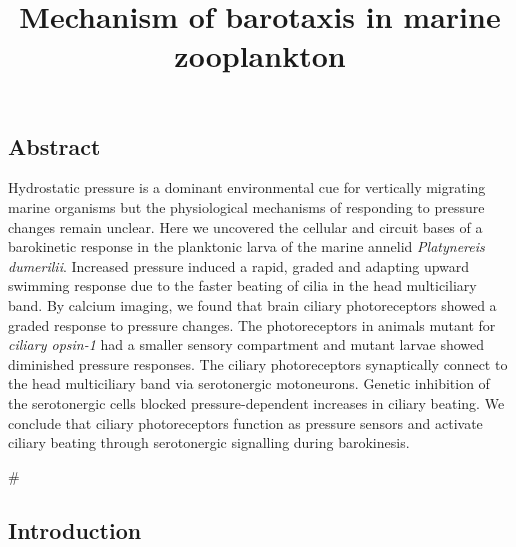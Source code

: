 \documentclass[
  11pt,
]{article}
\title{Mechanism of barotaxis in marine zooplankton}
\subtitle{\raggedright

Luis Alberto Bezares Calderón\textsuperscript{1,*} , Réza
Shahidi\textsuperscript{1,2}, Gáspár Jékely\textsuperscript{1,3,*}
\newline\textsuperscript{1}Living Systems Institute, University of
Exeter, Stocker road, Exeter, EX4 \newline\textsuperscript{2} Electron
Microscopy Core Facility (EMCF), University of Heidelberg, 69120
Heidelberg, Germany \newline\textsuperscript{3}Heidelberg University,
Centre for Organismal Studies (COS), 69120 Heidelberg, Germany \newline
\textsuperscript{*}Correspondence: l.a.bezares-calderon @ exeter.ac.uk,
gaspar.jekely @ cos.uni-heidelberg.de}
\author{}
\date{}
\renewcommand*\contentsname{Table of contents}
\newcommand\contentsname{Table of contents}
\begin{document}
\maketitle

\linenumbers

\renewcommand*\contentsname{Table of contents}
{
\hypersetup{linkcolor=}
\setcounter{tocdepth}{3}
\tableofcontents
}
\subsection{Abstract}\label{abstract}

Hydrostatic pressure is a dominant environmental cue for vertically
migrating marine organisms but the physiological mechanisms of
responding to pressure changes remain unclear. Here we uncovered the
cellular and circuit bases of a barokinetic response in the planktonic
larva of the marine annelid \emph{Platynereis dumerilii}. Increased
pressure induced a rapid, graded and adapting upward swimming response
due to the faster beating of cilia in the head multiciliary band. By
calcium imaging, we found that brain ciliary photoreceptors showed a
graded response to pressure changes. The photoreceptors in animals
mutant for \emph{ciliary opsin-1} had a smaller sensory compartment and
mutant larvae showed diminished pressure responses. The ciliary
photoreceptors synaptically connect to the head multiciliary band via
serotonergic motoneurons. Genetic inhibition of the serotonergic cells
blocked pressure-dependent increases in ciliary beating. We conclude
that ciliary photoreceptors function as pressure sensors and activate
ciliary beating through serotonergic signalling during barokinesis.

\#

\subsection{Introduction}\label{introduction}
\end{document}
